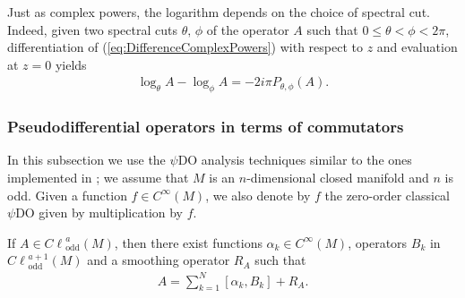 \documentclass[pdftex]{sigma}
\DeclareMathOperator{\odd}{odd} \DeclareMathOperator{\supp}{supp}
\def \Cl {{C\ell}}
\begin{document}
Just as complex powers, the logarithm depends on the choice of spectral cut. Indeed, given two spectral cuts $\theta,\, \phi$ of the operator $A$ such that $0\leq \theta <\phi <2\pi$, dif\/ferentiation of (\ref{eq:DifferenceComplexPowers}) with respect to $z$ and evaluation at $z=0$ yields
\begin{gather}
\log_\theta A-\log_\phi A=-2i\pi P_{\theta, \phi}(A). \label{eq:difflogarithms}
\end{gather}

\subsubsection{Pseudodif\/ferential operators in terms of commutators}

In this subsection we use the $\psi$DO analysis techniques similar to the ones implemented in \cite{maniccia}; we assume that $M$ is an $n$-dimensional closed manifold and $n$ is odd. Given a function $f\in C^\infty(M)$, we also denote by $f$ the zero-order classical $\psi$DO given by multiplication by $f$.
\begin{proposition}\label{prop:PDOsumComutators}
If $A\in\Cl^{a}_{\odd}(M)$, then there exist functions $\alpha_k\in C^\infty(M)$, operators $B_k$ in $\Cl^{a+1}_{\odd}(M)$ and a smoothing operator $R_A$ such that
\begin{gather}
A=\sum_{k=1}^N[\alpha_k,B_k]+R_A. \label{eq:PDOsumComutators}
\end{gather}
\end{proposition}
\end{document}
